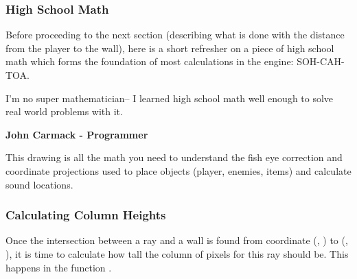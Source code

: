 \subsubsection{High School Math}
Before proceeding to the next section (describing what is done with the distance from the player to the wall), here is a short refresher on a piece of high school math which forms the foundation of most calculations in the engine: SOH-CAH-TOA.\\



\par
{}
\par
 \begin{fancyquotes}
  I'm no super mathematician-- I learned high school math well enough to solve real world problems with it.\\
 \par
\textbf{John Carmack - Programmer}
 \end{fancyquotes}
\par



This drawing is all the math you need to understand the fish eye correction and coordinate projections used to place objects (player, enemies, items) and calculate sound locations.\\






















\subsubsection{Calculating Column Heights}
Once the intersection between a ray and a wall is found from coordinate (, ) to (, ), it is time to calculate how tall the column of pixels for this ray should be. This happens in the function .\\

\begin{minipage}{\textwidth}

\end{minipage}

